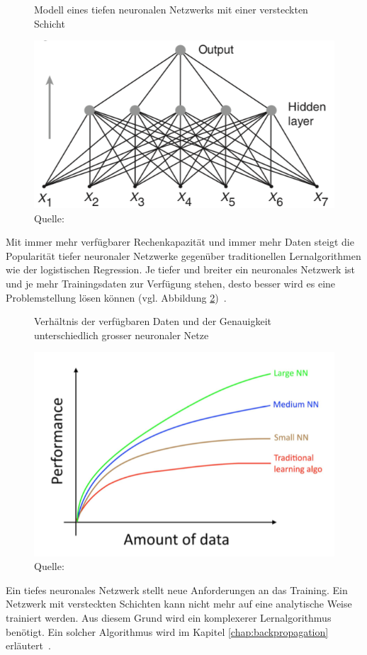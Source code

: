 \begin{figure}[h!]
    \captionsetup{width=.9\linewidth}
    \caption{Modell eines tiefen neuronalen Netzwerks mit einer versteckten Schicht}
    \label{krogh:c}
    \centering
    \includegraphics[width=0.4\linewidth]{graphics/krogh/krogh_deep-network.png}
    \vspace*{0.3cm}
    \caption*{Quelle: \textcite{Krogh2008}}
\end{figure}

Mit immer mehr verfügbarer Rechenkapazität und immer mehr Daten steigt die Popularität tiefer neuronaler Netzwerke gegenüber traditionellen Lernalgorithmen wie der logistischen Regression. Je tiefer und breiter ein neuronales Netzwerk ist und je mehr Trainingsdaten zur Verfügung stehen, desto besser wird es eine Problemstellung lösen können (vgl. Abbildung \ref{scale-drives-ml-progress})~\autocite{MLYearning}.

\begin{figure}[h!]
    \captionsetup{width=.9\linewidth}
    \caption{Verhältnis der verfügbaren Daten und der Genauigkeit unterschiedlich grosser neuronaler Netze}
    \label{scale-drives-ml-progress}
    \centering
    \includegraphics[width=0.4\linewidth]{graphics/scale-drives-ml-progress.png}
    \vspace*{0.3cm}
    \caption*{Quelle: \textcite{MLYearning}}
\end{figure}

Ein tiefes neuronales Netzwerk stellt neue Anforderungen an das Training. Ein Netzwerk mit versteckten Schichten kann nicht mehr auf eine analytische Weise trainiert werden. Aus diesem Grund wird ein komplexerer Lernalgorithmus benötigt. Ein solcher Algorithmus wird im Kapitel \ref{chap:backpropagation} erläutert~\autocite{Krogh2008}. 


